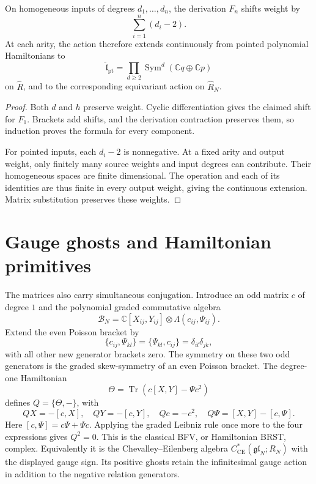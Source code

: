 \begin{proposition}\label{prop:vol2-pointed-action-completion}
On homogeneous inputs of degrees $d_1,\ldots,d_n$, the
derivation $F_n$ shifts weight by
\[
 \sum_{i=1}^n(d_i-2).
\]
At each arity, the action therefore extends continuously from
pointed polynomial Hamiltonians to
\[
 \widehat{\mathfrak l}_{\mathrm{pt}}
   =\prod_{d\geq2}\operatorname{Sym}^d(\mathbb Cq\oplus\mathbb Cp)
\]
on $\widehat R$, and to the corresponding equivariant action
on $\widehat R_N$.
\end{proposition}
\begin{proof}
Both $d$ and $h$ preserve weight. Cyclic differentiation gives
the claimed shift for $F_1$. Brackets add shifts, and the
derivation contraction preserves them, so induction proves the
formula for every component.

For pointed inputs, each $d_i-2$ is nonnegative. At a fixed
arity and output weight, only finitely many source weights
and input degrees can contribute. Their homogeneous spaces
are finite dimensional. The operation and each of its identities
are thus finite in every output weight, giving the continuous
extension. Matrix substitution preserves these weights.
\end{proof}

\section{Gauge ghosts and Hamiltonian primitives}
\label{sec:vol2-derived-action-bfv}

The matrices also carry simultaneous conjugation. Introduce
an odd matrix $c$ of degree $1$ and the polynomial graded
commutative algebra
\[
 \mathcal B_N=\mathbb C[X_{ij},Y_{ij}]
                  \otimes\Lambda(c_{ij},\Psi_{ij}).
\]
Extend the even Poisson bracket by
\[
 \{c_{ij},\Psi_{kl}\}=\{\Psi_{kl},c_{ij}\}
    =\delta_{il}\delta_{jk},
\]
with all other new generator brackets zero. The symmetry on
these two odd generators is the graded skew-symmetry of an
even Poisson bracket. The degree-one Hamiltonian
\[
 \Theta=\operatorname{Tr}(c[X,Y]-\Psi c^2)
\]
defines $Q=\{\Theta,-\}$, with
\begin{equation}\label{eq:vol2-classical-bfv-differential}
 QX=-[c,X],\quad QY=-[c,Y],\quad Qc=-c^2,
 \quad Q\Psi=[X,Y]-[c,\Psi].
\end{equation}
Here $[c,\Psi]=c\Psi+\Psi c$. Applying the graded Leibniz
rule once more to the four expressions gives $Q^2=0$.
This is the classical BFV, or Hamiltonian BRST, complex.
Equivalently it is the Chevalley--Eilenberg algebra
$C^*_{\mathrm{CE}}(\mathfrak{gl}_N;R_N)$ with the displayed
gauge sign. Its positive ghosts retain the infinitesimal gauge
action in addition to the negative relation generators.

